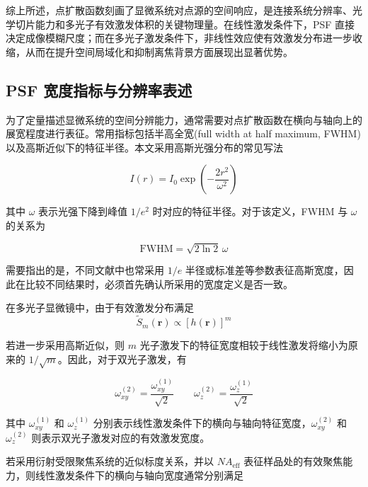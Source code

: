 综上所述，点扩散函数刻画了显微系统对点源的空间响应，是连接系统分辨率、光学切片能力和多光子有效激发体积的关键物理量。在线性激发条件下，PSF 直接决定成像模糊尺度；而在多光子激发条件下，非线性效应使有效激发分布进一步收缩，从而在提升空间局域化和抑制离焦背景方面展现出显著优势。



\subsection{PSF 宽度指标与分辨率表述}\label{2.2.2}
为了定量描述显微系统的空间分辨能力，通常需要对点扩散函数在横向与轴向上的展宽程度进行表征。常用指标包括半高全宽(full width at half maximum, FWHM)以及高斯近似下的特征半径。本文采用高斯光强分布的常见写法

\begin{equation}
  I(r)=I_0\exp\!\left(-\frac{2r^2}{\omega^2}\right)
  \label{eq:gaussian_width_def}
\end{equation}

其中 $\omega$ 表示光强下降到峰值 $1/e^2$ 时对应的特征半径。对于该定义，FWHM 与 $\omega$ 的关系为

\begin{equation}
  \mathrm{FWHM}=\sqrt{2\ln 2}\,\omega
  \label{eq:fwhm_omega_relation}
\end{equation}

需要指出的是，不同文献中也常采用 $1/e$ 半径或标准差等参数表征高斯宽度，因此在比较不同结果时，必须首先确认所采用的宽度定义是否一致。

在多光子显微镜中，由于有效激发分布满足
\begin{equation}
  \widetilde S_m(\mathbf r)\propto [h(\mathbf r)]^m
\end{equation}

若进一步采用高斯近似，则 $m$ 光子激发下的特征宽度相较于线性激发将缩小为原来的 $1/\sqrt m$。因此，对于双光子激发，有

\begin{equation}
  \omega_{xy}^{(2)}=\frac{\omega_{xy}^{(1)}}{\sqrt2} \qquad
  \omega_{z}^{(2)}=\frac{\omega_{z}^{(1)}}{\sqrt2}
  \label{eq:2p_width_scaling}
\end{equation}

其中 $\omega_{xy}^{(1)}$ 和 $\omega_{z}^{(1)}$ 分别表示线性激发条件下的横向与轴向特征宽度，$\omega_{xy}^{(2)}$ 和 $\omega_{z}^{(2)}$ 则表示双光子激发对应的有效激发宽度。

若采用衍射受限聚焦系统的近似标度关系，并以 $NA_{\mathrm{eff}}$ 表征样品处的有效聚焦能力，则线性激发条件下的横向与轴向宽度通常分别满足

